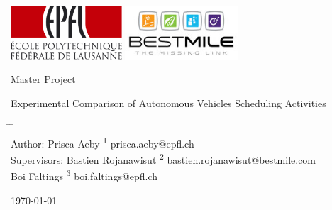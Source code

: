 \documentclass[12pt,a4paper]{article}
\begin{document}
\thispagestyle{empty}

  \vspace{-3cm}
  \includegraphics[height=2cm]{./images/EPFL.pdf}
  \hfill \includegraphics[height=2cm]{./images/bestmile.jpg}
  
  \hrulefill
  \vspace{3.0cm}

\begin{center}
 Master Project 
 \LARGE
 \bigskip
 
Experimental Comparison of Autonomous Vehicles Scheduling Activities
\end{center}



\vspace{2.0cm}
\begin{tabbing}
\hspace*{3cm}		\=	\hspace*{5cm}							\=	\hspace*{3cm} \\
Author:			\>	Prisca Aeby		  \textsuperscript{1}	\> prisca.aeby@epfl.ch\\
Supervisors:		\>	Bastien Rojanawisut	  \textsuperscript{2}	\> bastien.rojanawisut@bestmile.com\\	
					\>	Boi Faltings    \textsuperscript{3}	\> boi.faltings@epfl.ch\\
\end{tabbing}



\begin{center}

\today
\end{center}

\vfill
\hrulefill
\end{document}
